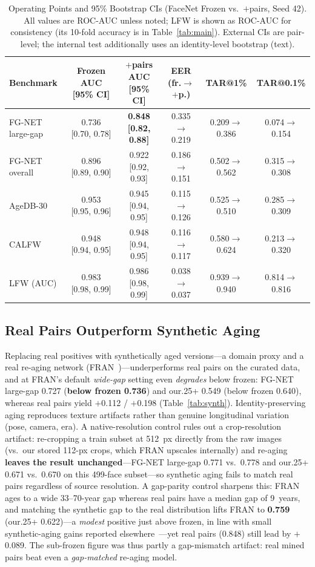 \documentclass[journal]{IEEEtran}
\begin{document}
\begin{table}[!t]
\renewcommand{\arraystretch}{1.2}
\caption{Operating Points and 95\% Bootstrap CIs (FaceNet Frozen vs.\ $+$pairs, Seed 42). All values are ROC-AUC unless noted; LFW is shown as ROC-AUC for consistency (its 10-fold accuracy is in Table~\ref{tab:main}). External CIs are pair-level; the internal test additionally uses an identity-level bootstrap (text).}
\label{tab:stats}
\centering
\footnotesize
\begin{tabular}{@{}lccccc@{}}
\toprule
Benchmark & Frozen AUC [95\% CI] & $+$pairs AUC [95\% CI] & EER (fr.$\to$$+$p.) & TAR@1\% & TAR@0.1\% \\
\midrule
FG-NET large-gap & 0.736 [0.70, 0.78] & \textbf{0.848 [0.82, 0.88]} & 0.335$\to$0.219 & 0.209$\to$0.386 & 0.074$\to$0.154 \\
FG-NET overall & 0.896 [0.89, 0.90] & 0.922 [0.92, 0.93] & 0.186$\to$0.151 & 0.502$\to$0.562 & 0.315$\to$0.308 \\
AgeDB-30 & 0.953 [0.95, 0.96] & 0.945 [0.94, 0.95] & 0.115$\to$0.126 & 0.525$\to$0.510 & 0.285$\to$0.309 \\
CALFW & 0.948 [0.94, 0.95] & 0.948 [0.94, 0.95] & 0.116$\to$0.117 & 0.580$\to$0.624 & 0.213$\to$0.320 \\
LFW (AUC) & 0.983 [0.98, 0.99] & 0.986 [0.98, 0.99] & 0.038$\to$0.037 & 0.939$\to$0.940 & 0.814$\to$0.816 \\
\bottomrule
\end{tabular}
\end{table}

\subsection{Real Pairs Outperform Synthetic Aging}\label{sec:res-synth}
Replacing real positives with synthetically aged versions---a domain proxy and a real re-aging network (FRAN~\cite{zoss2022fran})---underperforms real pairs on the curated data, and at FRAN's default \emph{wide-gap} setting even \emph{degrades} below frozen: FG-NET large-gap 0.727 (\textbf{below frozen 0.736}) and our.25+ 0.549 (below frozen 0.640), whereas real pairs yield $+$0.112 / $+$0.198 (Table~\ref{tab:synth}). Identity-preserving aging reproduces texture artifacts rather than genuine longitudinal variation (pose, camera, era). A native-resolution control rules out a crop-resolution artifact: re-cropping a train subset at 512~px directly from the raw images (vs.\ our stored 112-px crops, which FRAN upscales internally) and re-aging \textbf{leaves the result unchanged}---FG-NET large-gap 0.771 vs.\ 0.778 and our.25+ 0.671 vs.\ 0.670 on this 499-face subset---so synthetic aging fails to match real pairs regardless of source resolution. A gap-parity control sharpens this: FRAN ages to a wide 33--70-year gap whereas real pairs have a median gap of 9~years, and matching the synthetic gap to the real distribution lifts FRAN to \textbf{0.759} (our.25+ 0.622)---a \emph{modest} positive just above frozen, in line with small synthetic-aging gains reported elsewhere~\cite{yao2024synthageing}---yet real pairs (0.848) still lead by $+$0.089. The sub-frozen figure was thus partly a gap-mismatch artifact: real mined pairs beat even a \emph{gap-matched} re-aging model.
\end{document}
